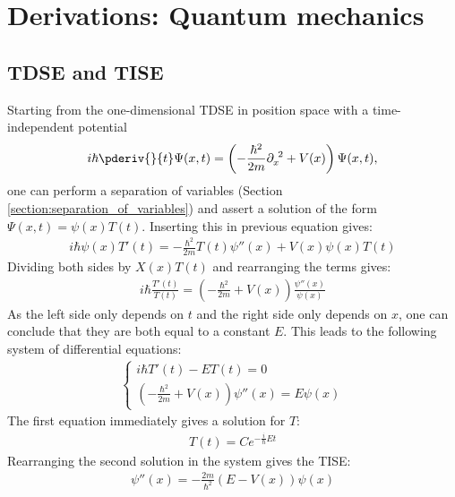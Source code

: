 \chapter{Derivations: Quantum mechanics}\label{chapter:derivations_qm}

\section{TDSE and TISE}\label{section:tdse_tise}

   	Starting from the one-dimensional TDSE in position space with a time-independent potential
    \begin{gather}
		i\hbar\pderiv{}{t}\Psi(x,t) = \left(-\frac{\hbar^2}{2m}\partial_x^{\ 2} + V(x)\right)\Psi(x,t),
	\end{gather}
    one can perform a separation of variables (Section \ref{section:separation_of_variables}) and assert a solution of the form $\Psi(x,t) = \psi(x)T(t)$. Inserting this in previous equation gives:
    \begin{gather}
		i\hbar\psi(x)T'(t) = -\frac{\hbar^2}{2m}T(t)\psi''(x) + V(x)\psi(x)T(t)
	\end{gather}
    Dividing both sides by $X(x)T(t)$ and rearranging the terms gives:
    \begin{gather}
		i\hbar\frac{T'(t)}{T(t)} = \left(-\frac{\hbar^2}{2m} + V(x)\right)\frac{\psi''(x)}{\psi(x)}
	\end{gather}
    As the left side only depends on $t$ and the right side only depends on $x$, one can conclude that they are both equal to a constant $E$. This leads to the following system of differential equations:
    \begin{gather}
        \begin{cases}
            i\hbar T'(t) - ET(t) = 0\\
            \left(-\frac{\hbar^2}{2m} + V(x)\right)\psi''(x) = E\psi(x)
        \end{cases}
    \end{gather}
    The first equation immediately gives a solution for $T$:
    \begin{gather}
       	\label{derivations:qm:exponential}
		T(t) = Ce^{-\frac{i}{\hbar}Et}
	\end{gather}
    Rearranging the second solution in the system gives the TISE:
    \begin{gather}
       	\label{derivations:qm:TISE}
		\psi''(x) = -\frac{2m}{\hbar^2}\left(E - V(x)\right)\psi(x)
	\end{gather}